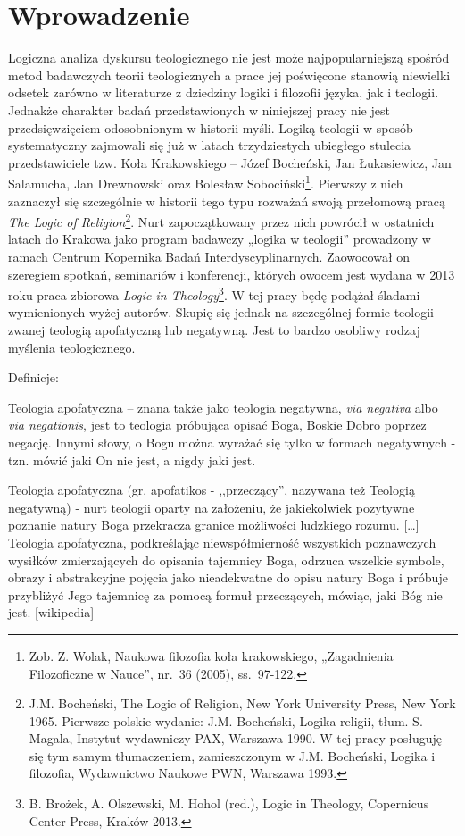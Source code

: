 \section{Wprowadzenie}
Logiczna analiza dyskursu teologicznego nie jest może najpopularniejszą
spośród metod badawczych teorii teologicznych a prace jej poświęcone
stanowią niewielki odsetek zarówno w literaturze z dziedziny logiki i
filozofii języka, jak i teologii. Jednakże charakter badań
przedstawionych w niniejszej pracy nie jest przedsięwzięciem
odosobnionym w historii myśli. Logiką teologii w sposób systematyczny
zajmowali się już w latach trzydziestych ubiegłego stulecia
przedstawiciele tzw. Koła Krakowskiego -- Józef Bocheński, Jan
Łukasiewicz, Jan Salamucha, Jan Drewnowski oraz Bolesław
Sobociński\footnote{Zob. Z. Wolak, Naukowa filozofia koła
krakowskiego, „Zagadnienia Filozoficzne w Nauce”, nr.~36 (2005),
ss.~97-122. }. Pierwszy z nich zaznaczył się szczególnie w historii
tego typu rozważań swoją przełomową pracą \textit{The Logic of
Religion}\footnote{J.M. Bocheński, The Logic of Religion, New York
University Press, New York 1965. Pierwsze polskie wydanie: J.M.
Bocheński, Logika religii, tłum. S. Magala, Instytut wydawniczy PAX,
Warszawa 1990. W tej pracy posługuję się tym samym tłumaczeniem,
zamieszczonym w J.M. Bocheński, Logika i filozofia, Wydawnictwo Naukowe
PWN, Warszawa 1993. }. Nurt zapoczątkowany przez nich powrócił w
ostatnich latach do Krakowa jako program badawczy „logika w teologii”
prowadzony w ramach Centrum Kopernika Badań Interdyscyplinarnych.
Zaowocował on szeregiem spotkań, seminariów i konferencji, których
owocem jest wydana w 2013 roku praca zbiorowa \textit{Logic in
Theology}\footnote{B. Brożek, A. Olszewski, M. Hohol (red.), Logic in
Theology, Copernicus Center Press, Kraków 2013. }. W tej pracy będę
podążał śladami wymienionych wyżej autorów. Skupię się jednak na
szczególnej formie teologii zwanej teologią apofatyczną lub negatywną.
Jest to bardzo osobliwy rodzaj myślenia teologicznego.


Definicje:
\begin{defin}
Teologia apofatyczna -- znana także jako teologia negatywna, \textit{via
negativa} albo \textit{via negationis}, jest to teologia próbująca
opisać Boga, Boskie Dobro poprzez negację. Innymi słowy, o Bogu można
wyrażać się tylko w formach negatywnych - tzn. mówić jaki On nie jest,
a nigdy jaki jest.
\end{defin}

\begin{defin}
Teologia apofatyczna (gr. apofatikos -
,,przeczący'', nazywana też Teologią
negatywną) - nurt teologii oparty na założeniu, że jakiekolwiek
pozytywne poznanie natury Boga przekracza granice możliwości ludzkiego
rozumu. […] Teologia apofatyczna, podkreślając niewspółmierność
wszystkich poznawczych wysiłków zmierzających do opisania tajemnicy
Boga, odrzuca wszelkie symbole, obrazy i abstrakcyjne pojęcia jako
nieadekwatne do opisu natury Boga i próbuje przybliżyć Jego tajemnicę
za pomocą formuł przeczących, mówiąc, jaki Bóg nie jest. [wikipedia]
\end{defin}


